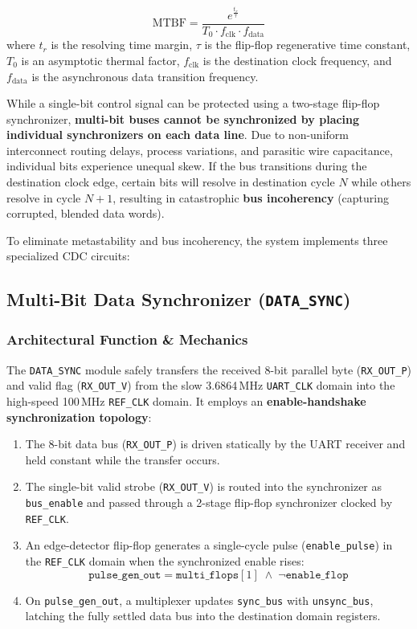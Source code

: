\documentclass[11pt,a4paper]{article}
\begin{document}
\begin{equation}
\text{MTBF} = \frac{e^{\frac{t_r}{\tau}}}{T_0 \cdot f_{\text{clk}} \cdot f_{\text{data}}}
\end{equation}
where $t_r$ is the resolving time margin, $\tau$ is the flip-flop regenerative time constant, $T_0$ is an asymptotic thermal factor, $f_{\text{clk}}$ is the destination clock frequency, and $f_{\text{data}}$ is the asynchronous data transition frequency.

While a single-bit control signal can be protected using a two-stage flip-flop synchronizer, \textbf{multi-bit buses cannot be synchronized by placing individual synchronizers on each data line}. Due to non-uniform interconnect routing delays, process variations, and parasitic wire capacitance, individual bits experience unequal skew. If the bus transitions during the destination clock edge, certain bits will resolve in destination cycle $N$ while others resolve in cycle $N+1$, resulting in catastrophic \textbf{bus incoherency} (capturing corrupted, blended data words).

To eliminate metastability and bus incoherency, the system implements three specialized CDC circuits:

\subsection{Multi-Bit Data Synchronizer (\texttt{DATA\_SYNC})}

\subsubsection{Architectural Function \& Mechanics}
The \texttt{DATA\_SYNC} module safely transfers the received 8-bit parallel byte (\texttt{RX\_OUT\_P}) and valid flag (\texttt{RX\_OUT\_V}) from the slow 3.6864\,MHz \texttt{UART\_CLK} domain into the high-speed 100\,MHz \texttt{REF\_CLK} domain. It employs an \textbf{enable-handshake synchronization topology}:
\begin{enumerate}
    \item The 8-bit data bus (\texttt{RX\_OUT\_P}) is driven statically by the UART receiver and held constant while the transfer occurs.
    \item The single-bit valid strobe (\texttt{RX\_OUT\_V}) is routed into the synchronizer as \texttt{bus\_enable} and passed through a 2-stage flip-flop synchronizer clocked by \texttt{REF\_CLK}.
    \item An edge-detector flip-flop generates a single-cycle pulse (\texttt{enable\_pulse}) in the \texttt{REF\_CLK} domain when the synchronized enable rises:
    \begin{equation}
    \texttt{pulse\_gen\_out} = \texttt{multi\_flops}[1] \;\land\; \neg\texttt{enable\_flop}
    \end{equation}
    \item On \texttt{pulse\_gen\_out}, a multiplexer updates \texttt{sync\_bus} with \texttt{unsync\_bus}, latching the fully settled data bus into the destination domain registers.
\end{enumerate}
\end{document}
